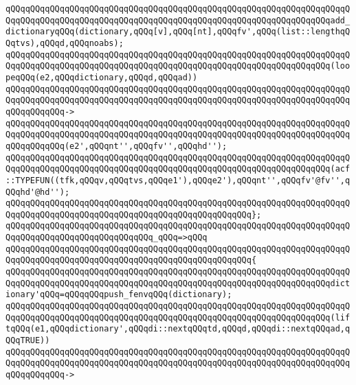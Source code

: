 \newline
\verb|qQQqqQQqqQQqqQQqqQQqqQQqqQQqqQQqqQQqqQQqqQQqqQQqqQQqqQQqqQQqqQQqqQQqqQQqqQQqqQQqqQQqqQQqqQQqqQQqqQQqqQQqqQQqqQQqqQQqqQQqqQQqqQQqqQQqqQQqadd_dictionaryqQQq(dictionary,qQQq[v],qQQq[nt],qQQqfv',qQQq(list::lengthqQQqtvs),qQQqd,qQQqnoabs);|\newline
\newline
\verb|qQQqqQQqqQQqqQQqqQQqqQQqqQQqqQQqqQQqqQQqqQQqqQQqqQQqqQQqqQQqqQQqqQQqqQQqqQQqqQQqqQQqqQQqqQQqqQQqqQQqqQQqqQQqqQQqqQQqqQQqqQQqqQQqqQQqqQQq(loopeqQQq(e2,qQQqdictionary,qQQqd,qQQqad))|\newline
\verb|qQQqqQQqqQQqqQQqqQQqqQQqqQQqqQQqqQQqqQQqqQQqqQQqqQQqqQQqqQQqqQQqqQQqqQQqqQQqqQQqqQQqqQQqqQQqqQQqqQQqqQQqqQQqqQQqqQQqqQQqqQQqqQQqqQQqqQQqqQQqqQQqqQQqqQQq->|\newline
\verb|qQQqqQQqqQQqqQQqqQQqqQQqqQQqqQQqqQQqqQQqqQQqqQQqqQQqqQQqqQQqqQQqqQQqqQQqqQQqqQQqqQQqqQQqqQQqqQQqqQQqqQQqqQQqqQQqqQQqqQQqqQQqqQQqqQQqqQQqqQQqqQQqqQQqqQQq(e2',qQQqnt'',qQQqfv'',qQQqhd'');|\newline
\newline
\verb|qQQqqQQqqQQqqQQqqQQqqQQqqQQqqQQqqQQqqQQqqQQqqQQqqQQqqQQqqQQqqQQqqQQqqQQqqQQqqQQqqQQqqQQqqQQqqQQqqQQqqQQqqQQqqQQqqQQqqQQqqQQqqQQqqQQqqQQq(acf::TYPEFUN((tfk,qQQqv,qQQqtvs,qQQqe1'),qQQqe2'),qQQqnt'',qQQqfv'@fv'',qQQqhd'@hd'');|\newline
\verb|qQQqqQQqqQQqqQQqqQQqqQQqqQQqqQQqqQQqqQQqqQQqqQQqqQQqqQQqqQQqqQQqqQQqqQQqqQQqqQQqqQQqqQQqqQQqqQQqqQQqqQQqqQQqqQQqqQQqqQQq};|\newline
\verb|qQQqqQQqqQQqqQQqqQQqqQQqqQQqqQQqqQQqqQQqqQQqqQQqqQQqqQQqqQQqqQQqqQQqqQQqqQQqqQQqqQQqqQQqqQQqqQQqqQQq_qQQq=>qQQq|\newline
\verb|qQQqqQQqqQQqqQQqqQQqqQQqqQQqqQQqqQQqqQQqqQQqqQQqqQQqqQQqqQQqqQQqqQQqqQQqqQQqqQQqqQQqqQQqqQQqqQQqqQQqqQQqqQQqqQQqqQQqqQQq{|\newline
\verb|qQQqqQQqqQQqqQQqqQQqqQQqqQQqqQQqqQQqqQQqqQQqqQQqqQQqqQQqqQQqqQQqqQQqqQQqqQQqqQQqqQQqqQQqqQQqqQQqqQQqqQQqqQQqqQQqqQQqqQQqqQQqqQQqqQQqqQQqdictionary'qQQq=qQQqqQQqpush_fenvqQQq(dictionary);|\newline
\newline
\verb|qQQqqQQqqQQqqQQqqQQqqQQqqQQqqQQqqQQqqQQqqQQqqQQqqQQqqQQqqQQqqQQqqQQqqQQqqQQqqQQqqQQqqQQqqQQqqQQqqQQqqQQqqQQqqQQqqQQqqQQqqQQqqQQqqQQqqQQq(liftqQQq(e1,qQQqdictionary',qQQqdi::nextqQQqtd,qQQqd,qQQqdi::nextqQQqad,qQQqTRUE))|\newline
\verb|qQQqqQQqqQQqqQQqqQQqqQQqqQQqqQQqqQQqqQQqqQQqqQQqqQQqqQQqqQQqqQQqqQQqqQQqqQQqqQQqqQQqqQQqqQQqqQQqqQQqqQQqqQQqqQQqqQQqqQQqqQQqqQQqqQQqqQQqqQQqqQQqqQQqqQQq->|\newline
